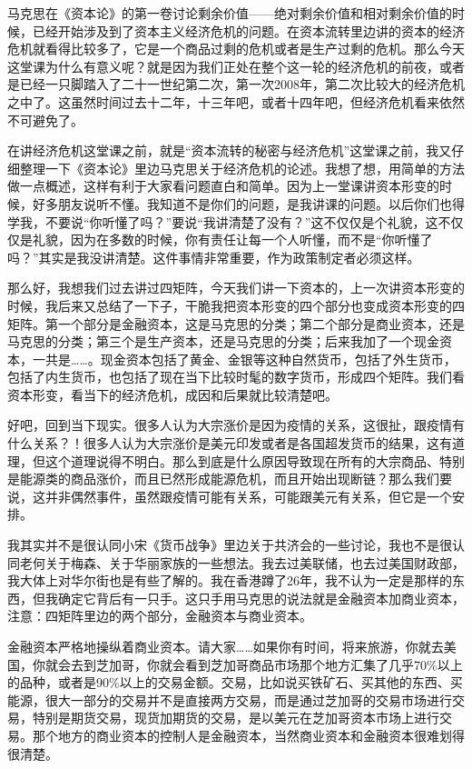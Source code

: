 \documentclass[UTF8, 12pt, a4paper]{ctexrep}
\begin{document}
马克思在《资本论》的第一卷讨论剩余价值——绝对剩余价值和相对剩余价值的时候，已经开始涉及到了资本主义经济危机的问题。在资本流转里边讲的资本的经济危机就看得比较多了，它是一个商品过剩的危机或者是生产过剩的危机。那么今天这堂课为什么有意义呢？就是因为我们正处在整个这一轮的经济危机的前夜，或者是已经一只脚踏入了二十一世纪第二次，第一次2008年，第二次比较大的经济危机之中了。这虽然时间过去十二年，十三年吧，或者十四年吧，但经济危机看来依然不可避免了。

在讲经济危机这堂课之前，就是“资本流转的秘密与经济危机”这堂课之前，我又仔细整理一下《资本论》里边马克思关于经济危机的论述。我想了想，用简单的方法做一点概述，这样有利于大家看问题直白和简单。因为上一堂课讲资本形变的时候，好多朋友说听不懂。我知道不是你们的问题，是我讲课的问题。以后你们也得学我，不要说“你听懂了吗？”要说“我讲清楚了没有？”这不仅仅是个礼貌，这不仅仅是礼貌，因为在多数的时候，你有责任让每一个人听懂，而不是“你听懂了吗？”其实是我没讲清楚。这件事情非常重要，作为政策制定者必须这样。

那么好，我想我们过去讲过四矩阵，今天我们讲一下资本的，上一次讲资本形变的时候，我后来又总结了一下子，干脆我把资本形变的四个部分也变成资本形变的四矩阵。第一个部分是金融资本，这是马克思的分类；第二个部分是商业资本，还是马克思的分类；第三个是生产资本，还是马克思的分类；后来我加了一个现金资本，一共是……。现金资本包括了黄金、金银等这种自然货币，包括了外生货币，包括了内生货币，也包括了现在当下比较时髦的数字货币，形成四个矩阵。我们看资本形变，看当下的经济危机，成因和后果就比较清楚吧。

好吧，回到当下现实。很多人认为大宗涨价是因为疫情的关系，这很扯，跟疫情有什么关系？！很多人认为大宗涨价是美元印发或者是各国超发货币的结果，这有道理，但这个道理说得不明白。那么到底是什么原因导致现在所有的大宗商品、特别是能源类的商品涨价，而且已然形成能源危机，而且开始出现断链？那么我们要说，这并非偶然事件，虽然跟疫情可能有关系，可能跟美元有关系，但它是一个安排。

我其实并不是很认同小宋《货币战争》里边关于共济会的一些讨论，我也不是很认同老何关于梅森、关于华丽家族的一些想法。我去过美联储，也去过美国财政部，我大体上对华尔街也是有些了解的。我在香港蹲了26年，我不认为一定是那样的东西，但我确定它背后有一只手。这只手用马克思的说法就是金融资本加商业资本，注意：四矩阵里边的两个部分，金融资本与商业资本。

金融资本严格地操纵着商业资本。请大家……如果你有时间，将来旅游，你就去美国，你就会去到芝加哥，你就会看到芝加哥商品市场那个地方汇集了几乎70\%以上的品种，或者是90\%以上的交易金额。交易，比如说买铁矿石、买其他的东西、买能源，很大一部分的交易并不是直接两方交易，而是通过芝加哥的交易市场进行交易，特别是期货交易，现货加期货的交易，是以美元在芝加哥资本市场上进行交易。那个地方的商业资本的控制人是金融资本，当然商业资本和金融资本很难划得很清楚。
\end{document}
